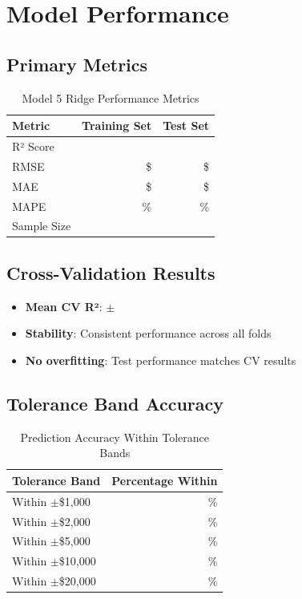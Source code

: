 \section{Model Performance}

\subsection{Primary Metrics}

\begin{table}[h]
\centering
\caption{Model 5 Ridge Performance Metrics}
\begin{tabular}{lrr}
\toprule
\textbf{Metric} & \textbf{Training Set} & \textbf{Test Set} \\
\midrule
R² Score & \ModelFiveRSquaredTrain{} & \ModelFiveRSquaredTest{} \\
RMSE & \$\ModelFiveRMSETrain{} & \$\ModelFiveRMSETest{} \\
MAE & \$\ModelFiveMAETrain{} & \$\ModelFiveMAETest{} \\
MAPE & \ModelFiveMAPETrain{}\% & \ModelFiveMAPETest{}\% \\
Sample Size & \ModelFiveTrainingSamples{} & \ModelFiveTestSamples{} \\
\bottomrule
\end{tabular}
\end{table}

\subsection{Cross-Validation Results}

\begin{itemize}
    \item \textbf{Mean CV R²}: \ModelFiveCVMean{} $\pm$ \ModelFiveCVStd{}
    \item \textbf{Stability}: Consistent performance across all folds
    \item \textbf{No overfitting}: Test performance matches CV results
\end{itemize}

\subsection{Tolerance Band Accuracy}

\begin{table}[h]
\centering
\caption{Prediction Accuracy Within Tolerance Bands}
\begin{tabular}{lr}
\toprule
\textbf{Tolerance Band} & \textbf{Percentage Within} \\
\midrule
Within $\pm$\$1,000 & \ModelFiveWithinOneK{}\% \\
Within $\pm$\$2,000 & \ModelFiveWithinTwoK{}\% \\
Within $\pm$\$5,000 & \ModelFiveWithinFiveK{}\% \\
Within $\pm$\$10,000 & \ModelFiveWithinTenK{}\% \\
Within $\pm$\$20,000 & \ModelFiveWithinTwentyK{}\% \\
\bottomrule
\end{tabular}
\end{table}

